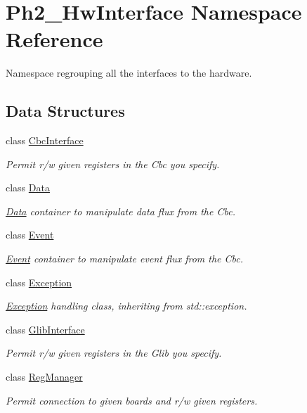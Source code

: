 \hypertarget{namespace_ph2___hw_interface}{\section{Ph2\-\_\-\-Hw\-Interface Namespace Reference}
\label{namespace_ph2___hw_interface}
}


Namespace regrouping all the interfaces to the hardware.  


\subsection*{Data Structures}
\begin{DoxyCompactItemize}
\item 
class \hyperlink{class_ph2___hw_interface_1_1_cbc_interface}{Cbc\-Interface}
\begin{DoxyCompactList}\small\item\em Permit r/w given registers in the Cbc you specify. \end{DoxyCompactList}\item 
class \hyperlink{class_ph2___hw_interface_1_1_data}{Data}
\begin{DoxyCompactList}\small\item\em \hyperlink{class_ph2___hw_interface_1_1_data}{Data} container to manipulate data flux from the Cbc. \end{DoxyCompactList}\item 
class \hyperlink{class_ph2___hw_interface_1_1_event}{Event}
\begin{DoxyCompactList}\small\item\em \hyperlink{class_ph2___hw_interface_1_1_event}{Event} container to manipulate event flux from the Cbc. \end{DoxyCompactList}\item 
class \hyperlink{class_ph2___hw_interface_1_1_exception}{Exception}
\begin{DoxyCompactList}\small\item\em \hyperlink{class_ph2___hw_interface_1_1_exception}{Exception} handling class, inheriting from std\-::exception. \end{DoxyCompactList}\item 
class \hyperlink{class_ph2___hw_interface_1_1_glib_interface}{Glib\-Interface}
\begin{DoxyCompactList}\small\item\em Permit r/w given registers in the Glib you specify. \end{DoxyCompactList}\item 
class \hyperlink{class_ph2___hw_interface_1_1_reg_manager}{Reg\-Manager}
\begin{DoxyCompactList}\small\item\em Permit connection to given boards and r/w given registers. \end{DoxyCompactList}\end{DoxyCompactItemize}
